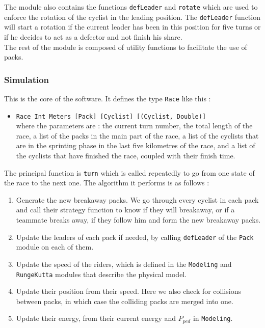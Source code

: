 \documentclass[10pt, a4paper]{report}
\begin{document}
The module also contains the functions \texttt{defLeader} and \texttt{rotate} which are used to enforce the rotation of the cyclist in the leading position. The \texttt{defLeader} function will start a rotation if the current leader has been in this position for five turns or if he decides to act as a defector and not finish his share. \\

The rest of the module is composed of utility functions to facilitate the use of packs.

\subsubsection{Simulation}

This is the core of the software. It defines the type \texttt{Race} like this :
\begin{itemize}
\item \texttt{Race Int Meters [Pack] [Cyclist] [(Cyclist, Double)]} \\ where the parameters are : the current turn number, the total length of the race, a list of the packs in the main part of the race, a list of the cyclists that are in the sprinting phase in the last five kilometres of the race, and a list of the cyclists that have finished the race, coupled with their finish time.
\end{itemize}

The principal function is \texttt{turn} which is called repeatedly to go from one state of the race to the next one. The algorithm it performs is as follows :

\begin{enumerate}
\item Generate the new breakaway packs. We go through every cyclist in each pack and call their strategy function to know if they will breakaway, or if a teammate breaks away, if they follow him and form the new breakaway packs.
\item Update the leaders of each pack if needed, by calling \texttt{defLeader} of the \texttt{Pack} module on each of them.
\item Update the speed of the riders, which is defined in the \texttt{Modeling} and \texttt{RungeKutta} modules that describe the physical model.
\item Update their position from their speed. Here we also check for collisions between packs, in which case the colliding packs are merged into one.
\item Update their energy, from their current energy and $P_{ped}$ in \texttt{Modeling}.
\end{enumerate}
\end{document}
